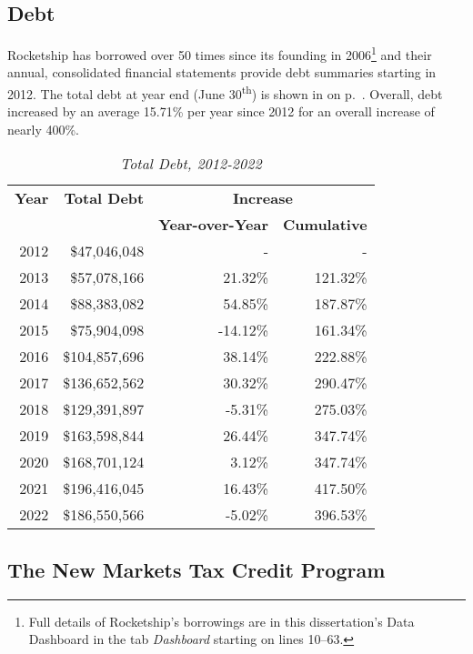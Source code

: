 \subsection{Debt}%
\label{sec:debt}\indent%

Rocketship has borrowed over 50 times since its founding in 2006\footnote{Full details of Rocketship's borrowings are in this dissertation's Data Dashboard in the tab \textit{Dashboard} starting on lines 10–63.} and their annual, consolidated financial statements provide debt summaries starting in 2012. The total debt at year end (June 30\textsuperscript{th})  is shown in  on p.~\pageref{tab:total_debt}. Overall, debt increased by an average 15.71\% per year since 2012 for an overall increase of nearly 400\%.

\begin{table}[ht]
  \caption[Total Debt, 2012-2022]{\textit{Total Debt, 2012-2022}}%
  \label{tab:total_debt}
  \begin{tabularx}{\textwidth}{rrrr}
    \toprule
    \textbf{Year} & \textbf{Total Debt} & \multicolumn{2}{c}{\textbf{Increase}} \\
                  &                     & \textbf{Year-over-Year} & \textbf{Cumulative} \\
    \midrule
    2012 & \$47,046,048  &         - &        - \\
    2013 & \$57,078,166  &   21.32\% & 121.32\% \\
    2014 & \$88,383,082  &   54.85\% & 187.87\% \\
    2015 & \$75,904,098  &  -14.12\% & 161.34\% \\
    2016 & \$104,857,696 &   38.14\% & 222.88\% \\
    2017 & \$136,652,562 &   30.32\% & 290.47\% \\
    2018 & \$129,391,897 &   -5.31\% & 275.03\% \\
    2019 & \$163,598,844 &   26.44\% & 347.74\% \\
    2020 & \$168,701,124 &    3.12\% & 347.74\% \\ 
    2021 & \$196,416,045 &   16.43\% & 417.50\% \\
    2022 & \$186,550,566 &   -5.02\% & 396.53\% \\
    \bottomrule
  \end{tabularx}
\end{table}

\subsection{The New Markets Tax Credit Program}%
\label{sec:NMTC}\indent%

